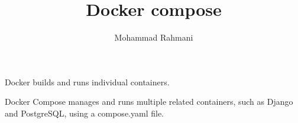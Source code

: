 \documentclass[a4paper]{article}
\title{Docker compose}
\date{}
\author{Mohammad Rahmani}
\begin{document}
    \maketitle
    Docker builds and runs individual containers.
    
    Docker Compose manages and runs multiple related containers, such as Django and PostgreSQL, using a compose.yaml file.
    
    
\end{document}
